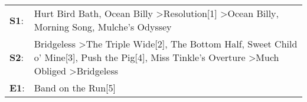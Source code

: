 \begin{supertabular}{p{0.03\textwidth}p{0.92\textwidth}}
 \textbf{S1}:  &                                                                                                                       Hurt Bird Bath\textsuperscript{}, \enspace Ocean Billy\textsuperscript{} \textgreater \enspace Resolution[1]\textsuperscript{} \textgreater \enspace Ocean Billy\textsuperscript{}, \enspace Morning Song\textsuperscript{}, \enspace Mulche's Odyssey\textsuperscript{}  \enspace  \\
 \textbf{S2}:  &  Bridgeless\textsuperscript{} \textgreater \enspace The Triple Wide[2]\textsuperscript{}, \enspace The Bottom Half\textsuperscript{}, \enspace Sweet Child o' Mine[3]\textsuperscript{}, \enspace Push the Pig[4]\textsuperscript{}, \enspace Miss Tinkle's Overture\textsuperscript{} \textgreater \enspace Much Obliged\textsuperscript{} \textgreater \enspace Bridgeless\textsuperscript{}  \enspace  \\
 \textbf{E1}:  &                                                                                                                                                                                                                                                                                                                                                           Band on the Run[5]\textsuperscript{}  \enspace  \\
\end{supertabular}
